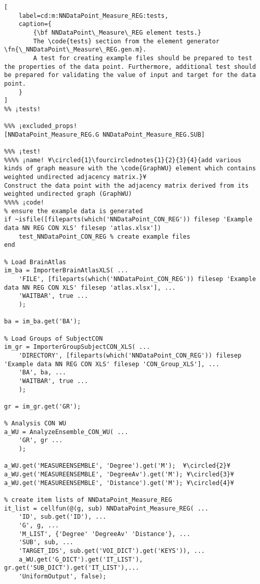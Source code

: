 \documentclass{tufte-handout}
\begin{document}
\begin{lstlisting}[
	label=cd:m:NNDataPoint_Measure_REG:tests,
	caption={
		{\bf NNDataPoint\_Measure\_REG element tests.}
		The \code{tests} section from the element generator \fn{\_NNDataPoint\_Measure\_REG.gen.m}.
		A test for creating example files should be prepared to test the properties of the data point. Furthermore, additional test should be prepared for validating the value of input and target for the data point.
	}
]		
%% ¡tests!

%%% ¡excluded_props!
[NNDataPoint_Measure_REG.G NNDataPoint_Measure_REG.SUB]

%%% ¡test!
%%%% ¡name! ¥\circled{1}\fourcirclednotes{1}{2}{3}{4}{add various kinds of graph measure with the \code{GraphWU} element which contains weighted undirected adjacency matrix.}¥
Construct the data point with the adjacency matrix derived from its weighted undirected graph (GraphWU) 
%%%% ¡code!
% ensure the example data is generated
if ~isfile([fileparts(which('NNDataPoint_CON_REG')) filesep 'Example data NN REG CON XLS' filesep 'atlas.xlsx'])
    test_NNDataPoint_CON_REG % create example files
end

% Load BrainAtlas
im_ba = ImporterBrainAtlasXLS( ...
    'FILE', [fileparts(which('NNDataPoint_CON_REG')) filesep 'Example data NN REG CON XLS' filesep 'atlas.xlsx'], ...
    'WAITBAR', true ...
    );

ba = im_ba.get('BA');

% Load Groups of SubjectCON
im_gr = ImporterGroupSubjectCON_XLS( ...
    'DIRECTORY', [fileparts(which('NNDataPoint_CON_REG')) filesep 'Example data NN REG CON XLS' filesep 'CON_Group_XLS'], ...
    'BA', ba, ...
    'WAITBAR', true ...
    );

gr = im_gr.get('GR');

% Analysis CON WU
a_WU = AnalyzeEnsemble_CON_WU( ...
    'GR', gr ...
    );

a_WU.get('MEASUREENSEMBLE', 'Degree').get('M');  ¥\circled{2}¥
a_WU.get('MEASUREENSEMBLE', 'DegreeAv').get('M'); ¥\circled{3}¥
a_WU.get('MEASUREENSEMBLE', 'Distance').get('M'); ¥\circled{4}¥

% create item lists of NNDataPoint_Measure_REG
it_list = cellfun(@(g, sub) NNDataPoint_Measure_REG( ...
    'ID', sub.get('ID'), ...
    'G', g, ...
    'M_LIST', {'Degree' 'DegreeAv' 'Distance'}, ...
    'SUB', sub, ...
    'TARGET_IDS', sub.get('VOI_DICT').get('KEYS')), ...
    a_WU.get('G_DICT').get('IT_LIST'), gr.get('SUB_DICT').get('IT_LIST'),...
    'UniformOutput', false);


\end{lstlisting}
\end{document}
